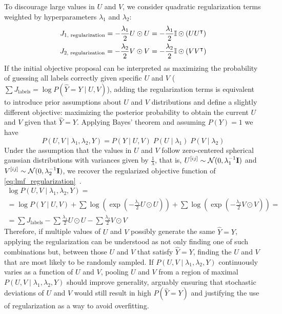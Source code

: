 To discourage large values in $U$ and $V$, we consider quadratic regularization terms weighted by hyperparameters $\lambda_1$ and $\lambda_2$:
%
\begin{gather}
    J_\text{1, regularization}
        = -\frac{\lambda_1}{2} U \odot U
        = -\frac{\lambda_1}{2} \mathbb{I} \odot (UU^\intercal)\\
    J_\text{2, regularization}
        = - \frac{\lambda_2}{2} V \odot V
        = - \frac{\lambda_2}{2} \mathbb{I} \odot (VV^\intercal)
    \label{eq:lmf_regularization}
\end{gather}
%
If the initial objective proposal can be interpreted as maximizing the probability of guessing all labels correctly given specific $U$ and $V$ ($\sum J_\text{labels} = \log P(\hat Y=Y\mid U,V)$), adding the regularization terms is equivalent to introduce prior assumptions about $U$ and $V$ distributions and define a slightly different objective: maximizing the posterior probability to obtain the current $U$ and $V$ given that $\hat Y = Y$. Applying Bayes' theorem and assuming $P(Y) = 1$ we have
%
\begin{equation}
    P(U,V\mid \lambda_1, \lambda_2, Y) = P(Y\mid U,V)\; P(U\mid \lambda_1) \; P(V\mid \lambda_2)
\end{equation}
%
Under the assumption that the values in $U$ and $V$ follow zero-centered spherical gaussian distributions with variances given by $\frac{1}{\lambda}$, that is, $U^{[ij]}\sim\mathcal{N}(0, \lambda_1^{-1}\mathbf{I})$ and $V^{[ij]}\sim\mathcal{N}(0, \lambda_2^{-1}\mathbf{I})$, we recover the regularized objective function of \autoref{eq:lmf_regularization}~\cite{johnsonlogistic}.
%
\begin{multline}
    \log P(U,V\mid \lambda_1, \lambda_2, Y)
    =\\
    = \log P(Y\mid U,V)
        + \sum \log(\exp(-\frac{\lambda_1}{2} U \odot U))
        + \sum \log(\exp(-\frac{\lambda_2}{2} V \odot V))
    =\\
    = \sum J_\text{labels}
        - \sum \frac{\lambda_1}{2} U \odot U
        - \sum \frac{\lambda_2}{2} V \odot V
\end{multline}
%
Therefore, if multiple values of $U$ and $V$ possibly generate the same $\hat Y = Y$, applying the regularization can be understood as not only finding one of such combinations but, between those $U$ and $V$ that satisfy $\hat Y = Y$, finding the $U$ and $V$ that are most likely to be randomly sampled. If $P(U, V\mid \lambda_1, \lambda_2, Y)$ continuously varies as a function of $U$ and $V$, pooling $U$ and $V$ from a region of maximal $P(U, V\mid \lambda_1, \lambda_2, Y)$ should improve generality, arguably ensuring that stochastic deviations of $U$ and $V$ would still result in high $P(\hat Y = Y)$ and justifying the use of regularization as a way to avoid overfitting. %


